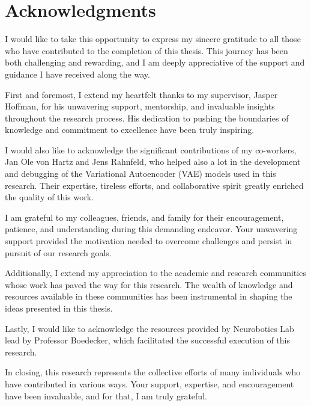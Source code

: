 \chapter{Acknowledgments}

I would like to take this opportunity to express my sincere gratitude to all those who have contributed to the completion of this thesis. This journey has been both challenging and rewarding, and I am deeply appreciative of the support and guidance I have received along the way.

First and foremost, I extend my heartfelt thanks to my supervisor, Jasper Hoffman, for his unwavering support, mentorship, and invaluable insights throughout the research process. His dedication to pushing the boundaries of knowledge and commitment to excellence have been truly inspiring.

I would also like to acknowledge the significant contributions of my co-workers, Jan Ole von Hartz and Jens Rahnfeld, who helped also a lot in the development and debugging of the Variational Autoencoder (VAE) models used in this research. Their expertise, tireless efforts, and collaborative spirit greatly enriched the quality of this work.

I am grateful to my colleagues, friends, and family for their encouragement, patience, and understanding during this demanding endeavor. Your unwavering support provided the motivation needed to overcome challenges and persist in pursuit of our research goals.

Additionally, I extend my appreciation to the academic and research communities whose work has paved the way for this research. The wealth of knowledge and resources available in these communities has been instrumental in shaping the ideas presented in this thesis.

Lastly, I would like to acknowledge the resources provided by Neurobotics Lab lead by Professor Boedecker, which facilitated the successful execution of this research.

In closing, this research represents the collective efforts of many individuals who have contributed in various ways. Your support, expertise, and encouragement have been invaluable, and for that, I am truly grateful.